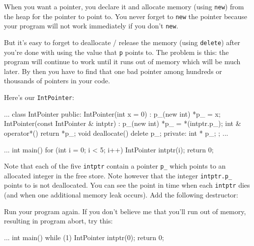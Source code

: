 \newpage{}

When you want a pointer, you declare it and allocate memory (using
\texttt{new}) from the heap for the pointer to point to. You never forget
to \texttt{new} the pointer because your program will not work immediately
if you don't \texttt{new}.

But it's easy to forget to deallocate / release the
memory (using \texttt{delete}) after you're done with
using the value that \texttt{p} points to. The problem is this: the
program will continue to work until it runs out of memory which will be
much later. By then you have to find that one bad pointer among hundreds
or thousands of pointers in your code.

Here's our \texttt{IntPointer}:

\begin{consolethree}[escapeinside=||]
...
class IntPointer
{
public:
    IntPointer(int x = 0)
        : p_(new int)
    {
        *p_ = x;
    }
    IntPointer(const IntPointer & intptr)
        : p_(new int)
    {
        *p_ = *(intptr.p_);
    }
    int & operator*()
    {
        return *p_;
    }
    void deallocate()
    {
        delete p_;
    }
private:
    int * p_;
};
...
\end{consolethree}

\begin{consolethree}[escapeinside=||]
...
int main()
{
    for (int i = 0; i < 5; i++)
    {
        IntPointer intptr(i);
    }
    return 0;
}
\end{consolethree}

Note that each of the five \texttt{intptr} contain a pointer \texttt{p\_}
which points to an allocated integer in the free store. Note however
that the integer \texttt{intptr.p\_} points to is not deallocated. You can
see the point in time when each \texttt{intptr} dies (and when one
additional memory leak occurs). Add the following destructor:

\begin{consolethree}[escapeinside=||]
...
class IntPointer
{
public:
    ...
    ~IntPointer()
    {
        std::cout << "memory leak ... :(\n";
    }
    ...
\end{consolethree}

Run your program again. If you don't believe me that
you'll run out of memory, resulting in program abort,
try this:

\begin{consolethree}[escapeinside=||]
...
int main()
{
    while (1)
    {
        IntPointer intptr(0);
    }
    return 0;
}
\end{consolethree}

